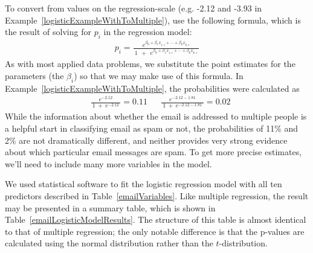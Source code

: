 To convert from values on the regression-scale (e.g. -2.12 and -3.93 in Example~\ref{logisticExampleWithToMultiple}), use the following formula, which is the result of solving for $p_i$ in the regression model:
\begin{align*}
p_i
	= \frac{e^{\beta_0 + \beta_1 x_{1,i}+\cdots+\beta_k x_{k,i}}}
		{\ 1\ \ +\ \ e^{\beta_0 + \beta_1 x_{1,i}+\cdots+\beta_k x_{k,i}}\ }
\end{align*}
As with most applied data problems, we substitute the point estimates for the parameters (the $\beta_i$) so that we may make use of this formula. In Example~\ref{logisticExampleWithToMultiple}, the probabilities were calculated as
\begin{align*}
&\frac{\ e^{-2.12}\ }{\ 1\ +\ e^{-2.12}\ } = 0.11 && \frac{\ e^{-2.12 - 1.81}\ }{\ 1\ +\ e^{-2.12 - 1.81}\ } = 0.02
\end{align*}
While the information about whether the email is addressed to multiple people is a helpful start in classifying email as spam or not, the probabilities of 11\% and 2\% are not dramatically different, and neither provides very strong evidence about which particular email messages are spam. To get more precise estimates, we'll need to include many more variables in the model.

We used statistical software to fit the logistic regression model with all ten predictors described in Table~\ref{emailVariables}. Like multiple regression, the result may be presented in a summary table, which is shown in Table~\ref{emailLogisticModelResults}. The structure of this table is almost identical to that of multiple regression; the only notable difference is that the p-values are calculated using the normal distribution rather than the $t$-distribution.

